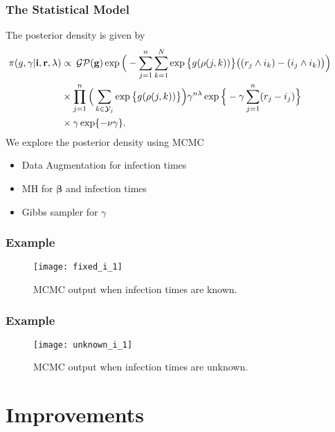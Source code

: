 \documentclass[demo]{beamer}
\begin{document}
\begin{frame}
\frametitle{The Statistical Model}
The posterior density is given by
\begin{align*}
\hspace{-2em}\pi(g, \gamma |\textbf{i}, \textbf{r}, \lambda) & \propto  \> \mathcal{GP}(\textbf{g})\exp\Big(- \sum\limits_{j=1}^n\sum\limits_{k=1}^N \exp\big\{g(\rho(j, k))\big\}\big((r_j \wedge i_k) - (i_j \wedge i_k)\big)\Big)  \\ 
& \times \prod\limits_{j=1}^n\Big(\sum\limits_{k \in \mathcal{Y}_j} \exp\big\{g(\rho(j, k))\big\}\Big)\gamma^{n\lambda}\exp\Big\{-\gamma\sum\limits_{j=1}^n  (r_j-i_j)\Big\}\\
& \times  \gamma\exp\{-\nu\gamma\}. 
\end{align*}
We explore the posterior density using MCMC
\begin{itemize}
	\item Data Augmentation for infection times
	\item MH for $\boldsymbol{\beta}$ and infection times
	\item Gibbs sampler for $\gamma$
\end{itemize}
\end{frame}


\begin{frame}
	\frametitle{Example}
	\centering
	\begin{figure}
		\texttt{[image: fixed\_i\_1]}
	\caption{MCMC output when infection times are known.}
	\end{figure}

\end{frame}

\begin{frame}
	\frametitle{Example}
	\centering
	\begin{figure}
		\texttt{[image: unknown\_i\_1]}
		\caption{MCMC output when infection times are unknown.}
	\end{figure}
	
\end{frame}


\section{Improvements}
\end{document}
